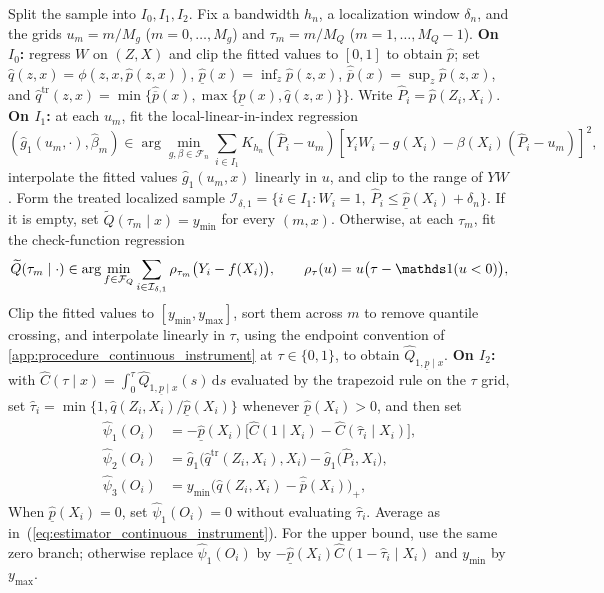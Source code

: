 \begin{algorithm}[!ht]
\caption{Estimator: continuous instrument}\label{alg:continuous_instrument}
\begin{algorithmic}[1]
\STATE Split the sample into $I_0, I_1, I_2$. Fix a bandwidth $h_n$, a localization window $\delta_n$, and the grids $u_m=m/M_g$ ($m=0,\ldots,M_g$) and $\tau_m=m/M_Q$ ($m=1,\ldots,M_Q-1$).
\STATE \textbf{On $I_0$:} regress $W$ on $(Z,X)$ and clip the fitted values to $[0,1]$ to obtain $\hat p$; set $\hat q(z,x)=\phi(z,x,\hat p(z,x))$, $\hat{\underline p}(x)=\inf_z\hat p(z,x)$, $\hat{\overline p}(x)=\sup_z\hat p(z,x)$, and $\hat q^{\mathrm{tr}}(z,x)=\min\{\hat{\overline p}(x),\max\{\hat{\underline p}(x),\hat q(z,x)\}\}$. Write $\hat P_i=\hat p(Z_i,X_i)$.
\STATE \textbf{On $I_1$:} at each $u_m$, fit the local-linear-in-index regression
    \[
    (\hat g_1(u_m,\cdot),\hat\beta_m)\in\arg\min_{g,\beta\in\mathcal F_n}\sum_{i\in I_1}K_{h_n}(\hat P_i-u_m)\left[Y_iW_i-g(X_i)-\beta(X_i)(\hat P_i-u_m)\right]^2,
    \]
    interpolate the fitted values $\hat g_1(u_m,x)$ linearly in $u$, and clip to the range of $YW$.
\STATE Form the treated localized sample $\mathcal I_{\delta,1}=\{i\in I_1:W_i=1,\ \hat P_i\leqslant\hat{\underline p}(X_i)+\delta_n\}$. If it is empty, set $\widetilde Q(\tau_m\mid x)=y_{\min}$ for every $(m,x)$. Otherwise, at each $\tau_m$, fit the check-function regression
    \[
    \widetilde Q(\tau_m\mid\cdot)\in\arg\min_{f\in\mathcal F_Q}\sum_{i\in\mathcal I_{\delta,1}}\rho_{\tau_m}\big(Y_i-f(X_i)\big),
    \qquad \rho_\tau(u)=u\big(\tau-\indicator(u<0)\big),
    \]
    Clip the fitted values to $[y_{\min},y_{\max}]$, sort them across $m$ to remove quantile crossing, and interpolate linearly in $\tau$, using the endpoint convention of \cref{app:procedure_continuous_instrument} at $\tau\in\{0,1\}$, to obtain $\widehat Q_{1,\underline p\mid x}$.
\STATE \textbf{On $I_2$:} with $\widehat C(\tau\mid x)=\int_0^\tau\widehat Q_{1,\underline p\mid x}(s)\,\mathrm ds$ evaluated by the trapezoid rule on the $\tau$ grid, set $\hat\tau_i=\min\{1,\hat q(Z_i,X_i)/\hat{\underline p}(X_i)\}$ whenever $\hat{\underline p}(X_i)>0$, and then set
    \begin{align*}
    \hat\psi_1(O_i)&=-\hat{\underline p}(X_i)\big[\widehat C(1\mid X_i)-\widehat C(\hat\tau_i\mid X_i)\big],\\
    \hat\psi_2(O_i)&=\hat g_1\big(\hat q^{\mathrm{tr}}(Z_i,X_i),X_i\big)-\hat g_1\big(\hat P_i,X_i\big),\\
    \hat\psi_3(O_i)&=y_{\min}\big(\hat q(Z_i,X_i)-\hat{\overline p}(X_i)\big)_+,
    \end{align*}
    When $\hat{\underline p}(X_i)=0$, set $\hat\psi_1(O_i)=0$ without evaluating $\hat\tau_i$. Average as in~(\ref{eq:estimator_continuous_instrument}). For the upper bound, use the same zero branch; otherwise replace $\hat\psi_1(O_i)$ by $-\hat{\underline p}(X_i)\widehat C(1-\hat\tau_i\mid X_i)$ and $y_{\min}$ by $y_{\max}$.
\end{algorithmic}
\end{algorithm}

